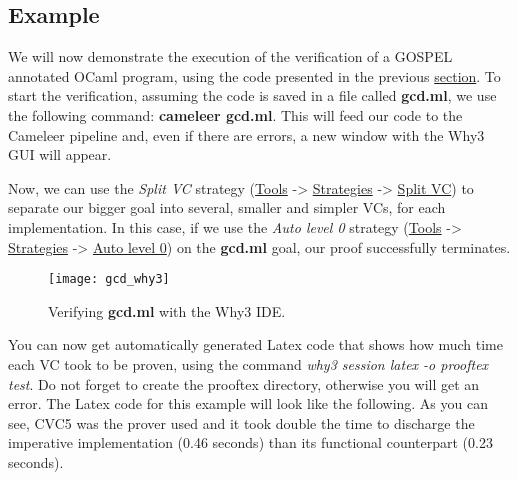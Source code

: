 \subsection{Example}
\label{subsec:cameleer_example}

We will now demonstrate the execution of the verification of a GOSPEL annotated OCaml program, using the code presented in the previous \hyperref[sec:gospel]{section}.
To start the verification, assuming the code is saved in a file called \textbf{gcd.ml}, we use the following command: \textbf{cameleer gcd.ml}.
This will feed our code to the Cameleer pipeline and, even if there are errors, a new window with the Why3 GUI will appear.

Now, we can use the \textit{Split VC} strategy (\underline{Tools} -> \underline{Strategies} -> \underline{Split VC}) to separate our bigger goal into several, smaller and simpler VCs, for each implementation.
In this case, if we use the \textit{Auto level 0} strategy (\underline{Tools} -> \underline{Strategies} -> \underline{Auto level 0}) on the \textbf{gcd.ml} goal, our proof successfully terminates.

\begin{figure}[htbp]
  \centering
  \begin{adjustbox}{frame,max width=\textwidth}
    \texttt{[image: gcd\_why3]}
  \end{adjustbox}
  \caption{Verifying \textbf{gcd.ml} with the Why3 IDE.}
  \label{fig:gcd_why3}
\end{figure}

You can now get automatically generated Latex code that shows how much time each VC took to be proven, using the command \textit{why3 session latex -o proof\textunderscore tex test}.
Do not forget to create the proof\textunderscore tex directory, otherwise you will get an error.
The Latex code for this example will look like the following.
As you can see, CVC5 was the prover used and it took double the time to discharge the imperative implementation (0.46 seconds) than its functional counterpart (0.23 seconds).

